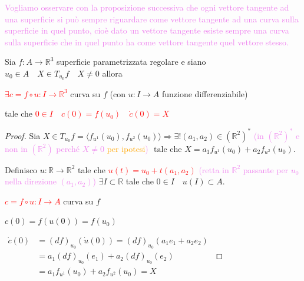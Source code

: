         \textcolor{violet}{Vogliamo osservare con la proposizione successiva
        che ogni vettore tangente ad una superficie si può sempre riguardare come vettore tangente
        ad una curva sulla superficie in quel punto, cioè dato un vettore tangente
        esiste sempre una curva sulla superficie che in quel punto ha come vettore tangente
        quel vettore stesso.}
        \begin{proposizione}
        \label{prop:Caratterizzazione_cinematica_del_piano_tangente}
        \mbox{}

        Sia $f \colon A \to \mathbb{R}^3$ superficie parametrizzata regolare e siano
        $u_0 \in A \quad X \in T_{u_0}f \quad X \neq 0$ allora

        \textcolor{red}{$\exists c = f \circ u \colon I \to \mathbb{R}^3$} curva su $f$ \textcolor{blu}{(con $u \colon I \to A$ funzione differenziabile)}

        tale che \textcolor{red}{$0 \in I \quad c(0) = f(u_0) \quad \dot{c}(0) = X$}
        \end{proposizione}
        \begin{proof}
        \mbox{}

        Sia $X \in T_{u_0}f= \langle f_{u^1}(u_0), f_{u^2}(u_0) \rangle \Rightarrow \exists ! (a_1, a_2) \in (\mathbb{R}^2)^* $ \textcolor{violet}{(in $(\mathbb{R}^2)^*$ e 
        non in $(\mathbb{R}^2)$ perché $X \neq 0$ \textcolor{orange}{per ipotesi})} 
        $\text{ tale che } X = a_1 f_{u^1}(u_0) + a_2 f_{u^2}(u_0)$.

        Definisco $u \colon \mathbb{R} \to \mathbb{R}^2$ tale che \textcolor{red}{$u(t)=u_0 + t(a_1, a_2)$} \textcolor{violet}{(retta in $\mathbb{R}^2$ passante per $u_0$ nella direzione $(a_1, a_2)$)} $\exists I \subset \mathbb{R}$ 
        tale che $0 \in I \quad u(I) \subset A$. 

        \textcolor{red}{$c= f \circ u \colon I \to A$} curva su $f$

        $c(0)=f(u(0))=f(u_0)$

        $\begin{aligned}
        \dot{c}(0) &= (df)_{u_0}(\dot{u}(0)) = (df)_{u_0}(a_1 e_1 + a_2 e_2) \\
        &= a_1 (df)_{u_0}(e_1) + a_2 (df)_{u_0}(e_2) \\
        &= a_1 f_{u^1}(u_0) + a_2 f_{u^2}(u_0) = X
        \end{aligned}$
        \end{proof}
        \newpage

